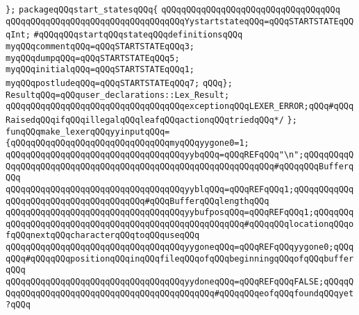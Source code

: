 \verb|};|\newline
\verb|packageqQQqstart_statesqQQq{|\newline
\verb|qQQqqQQqqQQqqQQqqQQqqQQqqQQqqQQqqQQq|\newline
\verb|qQQqqQQqqQQqqQQqqQQqqQQqqQQqqQQqqQQqYystartstateqQQq=qQQqSTARTSTATEqQQqInt;|\newline
\newline
\verb|#qQQqqQQqstartqQQqstateqQQqdefinitionsqQQq|\newline
\newline
\verb|myqQQqcommentqQQq=qQQqSTARTSTATEqQQq3;|\newline
\verb|myqQQqdumpqQQq=qQQqSTARTSTATEqQQq5;|\newline
\verb|myqQQqinitialqQQq=qQQqSTARTSTATEqQQq1;|\newline
\verb|myqQQqpostludeqQQq=qQQqSTARTSTATEqQQq7;|\newline
\newline
\verb|qQQq};|\newline
\verb|ResultqQQq=qQQquser_declarations::Lex_Result;|\newline
\verb|qQQqqQQqqQQqqQQqqQQqqQQqqQQqqQQqqQQqexceptionqQQqLEXER_ERROR;qQQq#qQQqRaisedqQQqifqQQqillegalqQQqleafqQQqactionqQQqtriedqQQq*/|\newline
\verb|};|\newline
\newline
\verb|funqQQqmake_lexerqQQqyyinputqQQq=|\newline
\verb|{qQQqqQQqqQQqqQQqqQQqqQQqqQQqqQQqmyqQQqyygone0=1;|\newline
\verb|qQQqqQQqqQQqqQQqqQQqqQQqqQQqqQQqqQQqyybqQQq=qQQqREFqQQq"\n";qQQqqQQqqQQqqQQqqQQqqQQqqQQqqQQqqQQqqQQqqQQqqQQqqQQqqQQqqQQqqQQq#qQQqqQQqBufferqQQq|\newline
\verb|qQQqqQQqqQQqqQQqqQQqqQQqqQQqqQQqqQQqyyblqQQq=qQQqREFqQQq1;qQQqqQQqqQQqqQQqqQQqqQQqqQQqqQQqqQQqqQQq#qQQqBufferqQQqlengthqQQq|\newline
\verb|qQQqqQQqqQQqqQQqqQQqqQQqqQQqqQQqqQQqyybufposqQQq=qQQqREFqQQq1;qQQqqQQqqQQqqQQqqQQqqQQqqQQqqQQqqQQqqQQqqQQqqQQqqQQqqQQq#qQQqqQQqlocationqQQqofqQQqnextqQQqcharacterqQQqtoqQQquseqQQq|\newline
\verb|qQQqqQQqqQQqqQQqqQQqqQQqqQQqqQQqqQQqyygoneqQQq=qQQqREFqQQqyygone0;qQQqqQQq#qQQqqQQqpositionqQQqinqQQqfileqQQqofqQQqbeginningqQQqofqQQqbufferqQQq|\newline
\verb|qQQqqQQqqQQqqQQqqQQqqQQqqQQqqQQqqQQqyydoneqQQq=qQQqREFqQQqFALSE;qQQqqQQqqQQqqQQqqQQqqQQqqQQqqQQqqQQqqQQqqQQqqQQq#qQQqqQQqeofqQQqfoundqQQqyet?qQQq|\newline
